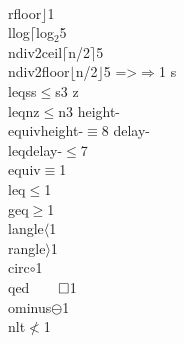 {                        {\\rfloor}{{\(\rfloor\)}}1
                        {\\llog}{{\(\lceil\)log\(_2\)}}5
                        {\\ndiv2ceil}{{\(\lceil\)n/2\(\rceil\)}}5
                        {\\ndiv2floor}{{\(\lfloor\)n/2\(\rfloor\)}}5
                        {=>}{{\(\Rightarrow\)}}1
                        {s\\leqs}{{s\(\leq\)s}}3
                        {z\\leqn}{{z\(\leq\)n}}3
                        {height-\\equiv}{{{\symbolstyle height-\(\equiv\)}}}8
                        {delay-\\leq}{{{\symbolstyle delay-\(\leq\)}}}7
                        {\\equiv}{{\(\equiv\)}}1
                        {\\leq}{{\(\leq\)}}1
                        {\\geq}{{\(\geq\)}}1
                        {\\langle}{{\(\langle\)}}1
                        {\\rangle}{{\(\rangle\)}}1
                        {\\circ}{{\(\circ\)}}1
                        {\\qed}{{\(\qed\)}}1
                        {\\ominus}{{\(\ominus\)}}1
                        {\\nlt}{{\(\not<\)}}1
}
\lstset{language=agda}